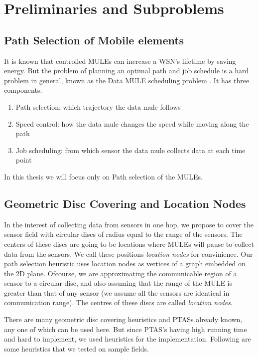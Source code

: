 \chapter{Preliminaries and Subproblems}

\section{Path Selection of Mobile elements}

It is known that controlled MULEs can increase a WSN's lifetime by saving energy. But the problem of planning an optimal path and job schedule is a hard problem in general, known as the Data MULE scheduling problem \cite{dms}. It has three components:
\begin{enumerate}
\item Path selection: which trajectory the data mule follows
\item Speed control: how the data mule changes the speed while moving along the path
\item Job scheduling: from which sensor the data mule collects data at each time point
\end{enumerate}
In this thesis we will focus only on Path selection of the MULEs.

\section{Geometric Disc Covering and Location Nodes}

In the interest of collecting data from sensors in one hop, we propose to cover the sensor field with circular discs of radius equal to the range of the sensors. The centers of these discs are going to be locations where MULEs will pause to collect data from the sensors. We call these positions \emph{location nodes} for convinience. Our path selection heuristic uses location nodes as vertices of a graph embedded on the 2D plane. Ofcourse, we are approximating the communicable region of a sensor to a circular disc, and also assuming that the range of the MULE is greater than that of any sensor (we assume all the sensors are identical in communication range). The centres of these discs are called \emph{location nodes}.

There are many geometric disc covering heuristics and PTASs \cite{} already known, any one of which can be used here. But since PTAS's having high running time \cite{} and hard to implement, we used heuristics for the implementation. Following are some heuristics that we tested on sample fields.

